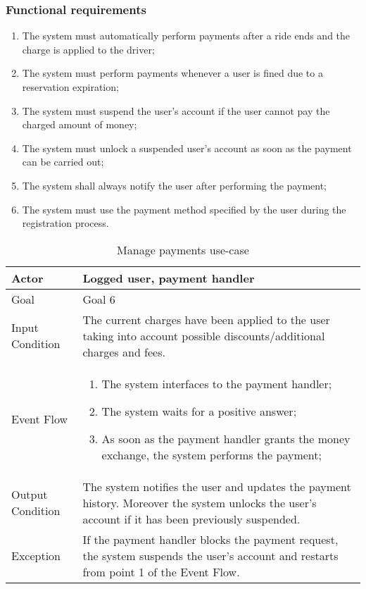 \subsubsection{Functional requirements}
\begin{enumerate}
\item The system must automatically perform payments after a ride ends and the charge is applied to the driver;
\item The system must perform payments whenever a user is fined due to a reservation expiration;
\item The system must suspend the user's account if the user cannot pay the charged amount of money;
\item The system must unlock a suspended user's account as soon as the payment can be carried out;
\item The system shall always notify the user after performing the payment;
\item The system must use the payment method specified by the user during the registration process.
\end{enumerate}

\begin{table}[H]
\begin{center}
\begin{tabular}{p{} | p{}}
\hline
Actor & Logged user, payment handler\\
\hline
Goal & Goal 6\\
\hline
Input Condition & The current charges have been applied to the user taking into account possible discounts/additional charges and fees.\\
\hline
Event Flow & 
\begin{enumerate}
\item The system interfaces to the payment handler;
\item The system waits for a positive answer;
\item As soon as the payment handler grants the money exchange, the system performs the payment;
\end{enumerate} \\
\hline
Output Condition & The system notifies the user and updates the payment history. Moreover the system unlocks the user's account if it has been previously suspended.\\
\hline
Exception & If the payment handler blocks the payment request, the system suspends the user's account and restarts from point 1 of the Event Flow.\\
\hline
\end{tabular}
\end{center}
\caption{Manage payments use-case}
\label{manage_payments_uc}
\end{table}